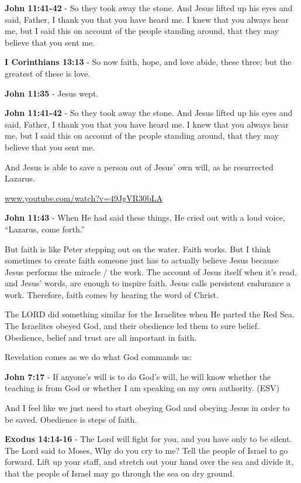 \documentclass[11pt]{article}
\begin{document}
\textbf{John 11:41-42} - So they took away the stone. And Jesus lifted up his eyes and said, Father, I thank you that you have heard me. I knew that you always hear me, but I said this on account of the people standing around, that they may believe that you sent me.

\textbf{I Corinthians 13:13} - So now faith, hope, and love abide, these three; but the greatest of these is love.

\textbf{John 11:35} - Jesus wept.

\textbf{John 11:41-42} - So they took away the stone. And Jesus lifted up his eyes and said, Father, I thank you that you have heard me. I knew that you always hear me, but I said this on account of the people standing around, that they may believe that you sent me.

And Jesus is able to save a person out of Jesus' own will, as he resurrected Lazarus.

\href{https://www.youtube.com/watch?v=49JgVR30bLA}{www.youtube.com/watch?v=49JgVR30bLA}

\textbf{John 11:43} - When He had said these things, He cried out with a loud voice, “Lazarus, come forth.”

But faith is like Peter stepping out on the water. Faith works. But I think sometimes to create faith someone just has to actually believe Jesus because Jesus performs the miracle / the work. The account of Jesus itself when it's read, and Jesus' words, are enough to inspire faith. Jesus calls persistent endurance a work. Therefore, faith comes by hearing the word of Christ.

The LORD did something similar for the Israelites when He parted the Red Sea.
The Israelites obeyed God, and their obedience led them to sure belief.
Obedience, belief and trust are all important in faith.

Revelation comes as we do what God commands us:

\textbf{John 7:17} - If anyone's will is to do God's will, he will know whether the teaching is from God or whether I am speaking on my own authority. (ESV)

And I feel like we just need to start obeying God and obeying Jesus in order to be saved. Obedience is steps of faith.

\textbf{Exodus 14:14-16} - The Lord will fight for you, and you have only to be silent.  The Lord said to Moses, Why do you cry to me? Tell the people of Israel to go forward.  Lift up your staff, and stretch out your hand over the sea and divide it, that the people of Israel may go through the sea on dry ground.
\end{document}
